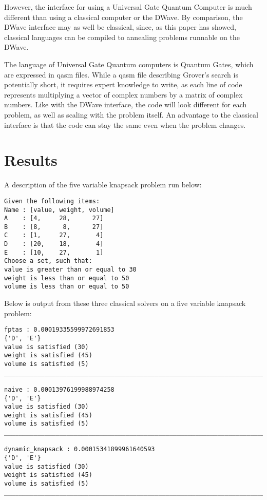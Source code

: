 \documentclass{article}
\begin{document}
However, the interface for using a Universal Gate Quantum Computer is much different than using a classical computer or the DWave.
By comparison, the DWave interface may as well be classical, since, as this paper has showed, classical languages can be compiled to annealing problems runnable on the DWave.

The language of Universal Gate Quantum computers is Quantum Gates, which are expressed in qasm files.
While a qasm file describing Grover's search is potentially short, it requires expert knowledge to write, as each line of code represents multiplying a vector of complex numbers by a matrix of complex numbers.
Like with the DWave interface, the code will look different for each problem, as well as scaling with the problem itself.
An advantage to the classical interface is that the code can stay the same even when the problem changes.       

\lstset{language=C}


\section{Results}

A description of the five variable knapsack problem run below:
\begin{verbatim}
Given the following items:
Name : [value, weight, volume]
A    : [4,     28,      27]
B    : [8,      8,      27]
C    : [1,     27,       4]
D    : [20,    18,       4]
E    : [10,    27,       1]
Choose a set, such that:
value is greater than or equal to 30
weight is less than or equal to 50
volume is less than or equal to 50
\end{verbatim}

Below is output from these three classical solvers on a five variable knapsack problem:

\begin{verbatim}
fptas : 0.00019335599972691853
{'D', 'E'}
value is satisfied (30)
weight is satisfied (45)
volume is satisfied (5)
________________________________________________________________________________

naive : 0.00013976199988974258
{'D', 'E'}
value is satisfied (30)
weight is satisfied (45)
volume is satisfied (5)
________________________________________________________________________________

dynamic_knapsack : 0.00015341899961640593
{'D', 'E'}
value is satisfied (30)
weight is satisfied (45)
volume is satisfied (5)
________________________________________________________________________________
\end{verbatim}
\end{document}
